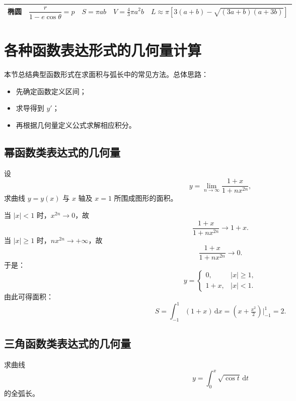 \begin{small}
\begin{longtable}{|c|c|c|c|c|}
        椭圆                                                                       & $\dfrac{r}{1 - e\cos\theta} = p$ &
        $\displaystyle S = \pi ab$                                               &
        $\displaystyle V = \tfrac{4}{3}\pi a^2 b$                                &
        $\displaystyle L \approx \pi[3(a+b) - \sqrt{(3a+b)(a+3b)}]$                                                                                                          \\ \hline
    \end{longtable}
\end{small}
\section{各种函数表达形式的几何量计算}

本节总结典型函数形式在求面积与弧长中的常见方法。总体思路：
\begin{itemize}
    \item 先确定函数定义区间；
    \item 求导得到 $y'$；
    \item 再根据几何量定义公式求解相应积分。
\end{itemize}

\subsection{幂函数类表达式的几何量}
\begin{example}{}{}
    设
    $$y = \lim_{n \to \infty} \frac{1 + x}{1 + n x^{2n}},$$
    求曲线 $y = y(x)$ 与 $x$ 轴及 $x = 1$ 所围成图形的面积。
\end{example}

\begin{solution}
    当 $|x| < 1$ 时，$x^{2n} \to 0$，故
    $$\frac{1 + x}{1 + n x^{2n}} \to 1 + x.$$
    当 $|x| \ge 1$ 时，$n x^{2n} \to +\infty$，故
    $$\frac{1 + x}{1 + n x^{2n}} \to 0.$$
    于是：
    $$
        y =
        \begin{cases}
            0,     & |x| \ge 1, \\[3pt]
            1 + x, & |x| < 1.
        \end{cases}
    $$
    由此可得面积：
    $$
        S = \int_{-1}^{1} (1 + x)\, \mathrm{d}x
        = \left(x + \tfrac{x^2}{2}\right)\Big|_{-1}^{1} = 2.
    $$
\end{solution}

\subsection{三角函数类表达式的几何量}
\begin{example}{}{}
    求曲线
    $$y = \int_{0}^{x} \sqrt{\cos t}\, \mathrm{d}t$$
    的全弧长。
\end{example}

